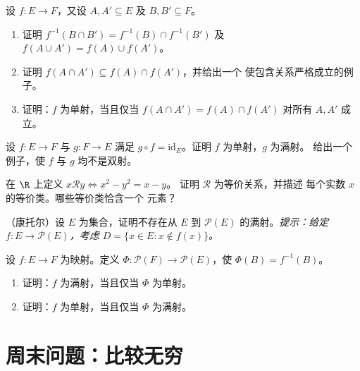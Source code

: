 \begin{exercise}[$\star\star$]\label{exo:b1:logic:8}
设 $f \colon E \to F$，又设 $A, A' \subseteq E$ 及 $B, B' \subseteq
F$。
\begin{enumerate}
  \item 证明 $f^{-1}(B \cap B') = f^{-1}(B) \cap f^{-1}(B')$ 及
        $f(A \cup A') = f(A) \cup f(A')$。
  \item 证明 $f(A \cap A') \subseteq f(A) \cap f(A')$，并给出一个
        使包含关系严格成立的例子。
  \item 证明：$f$ 为单射，当且仅当 $f(A \cap A') = f(A)
        \cap f(A')$ 对所有 $A, A'$ 成立。
\end{enumerate}
\end{exercise}

\begin{exercise}[$\star\star$]\label{exo:b1:logic:9}
设 $f \colon E \to F$ 与 $g \colon F \to E$ 满足 $g \circ f =
\mathrm{id}_E$。证明 $f$ 为单射，$g$ 为满射。
给出一个例子，使 $f$ 与 $g$ 均不是双射。
\end{exercise}

\begin{exercise}[$\star\star$]\label{exo:b1:logic:10}
在 $\R$ 上定义 $x \mathbin{\mathcal{R}} y \iff x^2 - y^2 = x - y$。
证明 $\mathcal{R}$ 为等价关系，并描述
每个实数 $x$ 的等价类。哪些等价类恰含一个
元素？
\end{exercise}

\begin{exercise}[$\star\star\star$]\label{exo:b1:logic:11}
（康托尔）设 $E$ 为集合，证明不存在从 $E$
到 $\mathcal{P}(E)$ 的满射。\emph{提示：给定 $f \colon E \to
\mathcal{P}(E)$，考虑 $D = \{x \in E : x \notin f(x)\}$。}
\end{exercise}

\begin{exercise}[$\star\star\star$]\label{exo:b1:logic:12}
设 $f \colon E \to F$ 为映射。定义 $\Phi \colon \mathcal{P}(F)
\to \mathcal{P}(E)$，使 $\Phi(B) = f^{-1}(B)$。
\begin{enumerate}
  \item 证明：$f$ 为满射，当且仅当 $\Phi$
        为单射。
  \item 证明：$f$ 为单射，当且仅当 $\Phi$
        为满射。
\end{enumerate}
\end{exercise}

\section{周末问题：比较无穷}

